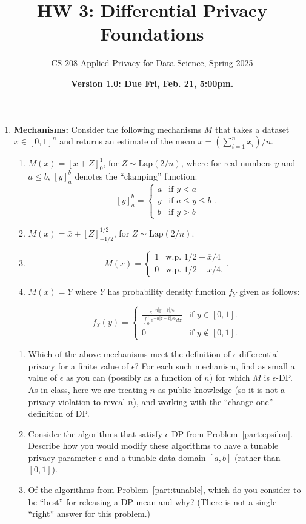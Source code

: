 \documentclass[11pt]{article}
\title{\vspace{-1.5cm} HW 3: Differential Privacy Foundations}
\author{CS 208 Applied Privacy for Data Science, Spring 2025}
\date{\textbf{Version 1.0: Due Fri, Feb. 21, 5:00pm.}}
\begin{document}
\maketitle

\instructions

\begin{enumerate}[leftmargin=*]

\item \textbf{Mechanisms:} Consider the following mechanisms $M$ that takes a dataset $x\in [0,1]^n$ and returns
an estimate of the mean $\bar{x} = (\sum_{i=1}^n x_i)/n$.

\begin{enumerate}[label=\roman*.]
    \item $M(x) = [\bar{x}+Z]^1_0$, for $Z\sim \mathrm{Lap}(2/n)$,
    where for real numbers $y$ and $a\leq b$, $[y]^b_a$ denotes the ``clamping'' function:
$$[y]^b_a = 
\begin{cases}
a & \text{if } y < a\\
y & \text{if } a\leq y\leq b\\
b & \text{if } y >b
\end{cases}.$$
    \item $M(x) = \bar{x}+[Z]^{1/2}_{-1/2}$, for $Z\sim \mathrm{Lap}(2/n)$.
    \item 
    $$M(x) = \begin{cases} 1 & \text{w.p. } 1/2+\overline{x}/4\\
    0 & \text{w.p. } 1/2-\overline{x}/4.
    \end{cases}.$$
    \item $M(x) = Y$ where $Y$ has probability density function $f_Y$ given as follows:
    
    $$f_Y(y) = \begin{cases}
    \frac{e^{-n|y-\bar{x}|/6}}{\int_0^1 e^{-n|z-\bar{x}|/6} dz} & \text{if } y\in [0,1].\\
    0 & \text{if } y\notin [0,1].
    \end{cases}$$
    
\end{enumerate}
\begin{enumerate}
    \item Which of the above mechanisms meet the definition of $\epsilon$-differential privacy for a finite value of $\epsilon$?  For each such mechanism, find as small a value of $\epsilon$ as you can (possibly as a function of $n$)  for which $M$ is $\epsilon$-DP.  
    \label{part:epsilon}
    As in class, here we are treating $n$ as public knowledge (so it is not a privacy violation to reveal $n$), and working with the ``change-one'' definition of DP.
    \item Consider the algorithms that satisfy $\epsilon$-DP from Problem~\ref{part:epsilon}. Describe how you would modify these algorithms 
    to have a tunable privacy parameter $\epsilon$ 
    and a tunable data
    domain $[a,b]$ (rather than $[0,1]$). \label{part:tunable}
    \item Of the algorithms from Problem~\ref{part:tunable}, which do you consider to be ``best'' for releasing a DP mean and why?  (There is
    not a single ``right'' answer for this problem.)
\iffalse
    

\end{enumerate}
\end{enumerate}
\end{document}
